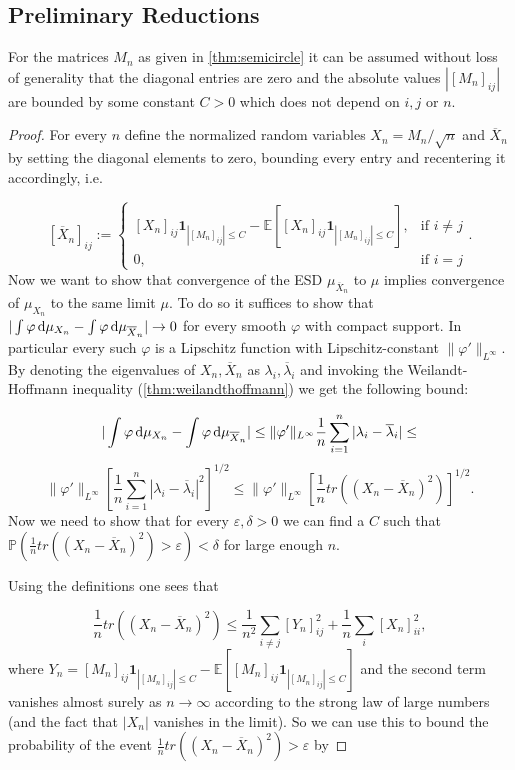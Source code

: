 \subsection{Preliminary Reductions}\label{ssec:prelimreduct}
\begin{lemma}
	For the matrices $M_n$ as given in \ref{thm:semicircle} it can be assumed without loss of generality that the diagonal entries are zero and the absolute values $|[M_n]_{ij}|$ are bounded by some constant $C>0$ which does not depend on $i,j$ or $n$.
\end{lemma}
\begin{proof}
	For every $n$ define the normalized random variables $X_n=M_n/\sqrt n$ and $\overline X_n$ by setting the diagonal elements to zero, bounding every entry and recentering it accordingly, i.e.

	$$[\overline X_n]_{ij}:=\begin{cases}
						[X_n]_{ij}\mathbf 1_{|[M_n]_{ij}|\leq C}-\mathbb E\left[[X_n]_{ij}\mathbf 1_{|[M_n]_{ij}|\leq C}\right], &\mbox{if } i\neq j \\
						0, &\mbox{if } i=j
					  \end{cases}.$$
	Now we want to show that convergence of the ESD $\mu_{\overline X_n}$ to $\mu$ implies convergence of $\mu_{X_n}$ to the same limit $\mu$. To do so it suffices to show that $|\int\varphi\mathop{}\!\mathrm{d}\mu_{X_n}-\int\varphi\mathop{}\!\mathrm{d}\mu_{\overline X_n}|\rightarrow 0$ for every smooth $\varphi$ with compact support. In particular every such $\varphi$ is a Lipschitz function with Lipschitz-constant $\|\varphi'\|_{L^\infty}$. By denoting the eigenvalues of $X_n,\overline X_n$ as $\lambda_i,\overline\lambda_i$ and invoking the Weilandt-Hoffmann inequality (\ref{thm:weilandthoffmann}) we get the following bound:
	
	$$|\int\varphi\mathop{}\!\mathrm{d}\mu_{X_n}-\int\varphi\mathop{}\!\mathrm{d}\mu_{\overline X_n}| \leq
	\|\varphi'\|_{L^\infty}\frac{1}{n}\sum_{i=1}^n|\lambda_i-\overline\lambda_i| \leq$$
	$$
	\|\varphi'\|_{L^\infty}\left[\frac{1}{n}\sum_{i=1}^n|\lambda_i-\overline\lambda_i|^2\right]^{1/2} \leq
	\|\varphi'\|_{L^\infty}\left[\frac{1}{n}tr\left((X_n-\overline X_n)^2\right)\right]^{1/2}.$$
	Now we need to show that for every $\varepsilon,\delta > 0$ we can find a $C$ such that $\mathbb P\left(\frac{1}{n}tr\left((X_n-\overline X_n)^2\right)>\varepsilon\right)<\delta$ for large enough $n$.
	
	Using the definitions one sees that
	
	$$\frac{1}{n}tr\left((X_n-\overline X_n)^2\right) \leq
	\frac{1}{n^2}\sum_{i\neq j}\left[Y_n\right]_{ij}^2+\frac{1}{n}\sum_i [X_n]_{ii}^2,$$
	where $Y_n=[M_n]_{ij}\mathbf 1_{|[M_n]_{ij}|\leq C}-\mathbb E\left[[M_n]_{ij}\mathbf 1_{|[M_n]_{ij}|\leq C}\right]$ and the second term vanishes almost surely as $n\rightarrow\infty$ according to the strong law of large numbers (and the fact that $|X_n|$ vanishes in the limit). So we can use this to bound the probability of the event $\frac{1}{n}tr\left((X_n-\overline X_n)^2\right)>\varepsilon$ by
	

\end{proof}
